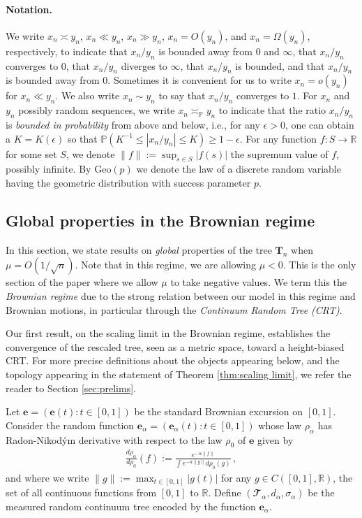 \documentclass{article}
\newcommand{\ccT}{\mathbfcal{T}}
\newcommand{\pr}{\mathbb{P}}								%
\newcommand{\Prob}[1]{\pr\left(#1\right)}					%
\newcommand{\1}{\mathbbm{1}}								%
\theoremstyle{definition}
\numberwithin{equation}{section}
\newcommand{\R}{\mathbb R}
\newcommand{\eps}{\epsilon}
\begin{document}
\paragraph{Notation.}
{We write $x_n\asymp y_n$, $x_n\ll y_n$, $x_n\gg y_n$, $x_n=O(y_n)$, and $x_n=\Omega( y_n)$, respectively, to indicate that $x_n/y_n$ is bounded away from $0$ and $\infty$, that $x_n/y_n$ converges to $0$, that $x_n/y_n$ diverges to $\infty$, that $x_n/y_n$ is bounded, and that $x_n/y_n$ is bounded away from $0$. Sometimes it is convenient for us to write $x_n=o(y_n)$ for $x_n\ll y_n$. We also write $x_n\sim y_n$ to say that $x_n/y_n$ converges to $1$. For $x_n$ and $y_n$ possibly random sequences, we write $x_n\asymp_{\mathbb{P}}y_n$ to indicate that the ratio $x_n/y_n$ is \textit{bounded in probability} from above and below, i.e., for any $\eps>0$, one can obtain a $K=K(\eps)$ so that $\Prob{K^{-1}\leq|x_n/y_n|\leq K}\geq 1-\eps$. For any function $f:S\to \R$ for some set $S$, we denote $\|f\|:=\sup_{s\in S}|f(s)|$ the supremum value of $f$, possibly infinite. By $\mathrm{Geo}(p)$ we denote the law of a discrete random variable having the geometric distribution with success parameter $p$.}

\subsection{Global properties in the Brownian regime}
In this section, we state results on \emph{global} properties of the tree $\mathbf{T}_n$ when $\mu=O( 1/\sqrt{n})$.
Note that in this regime, we are allowing $\mu<0$. This is the only section of the paper where we allow {$\mu$ to take negative values}.
We term this the \emph{Brownian regime} due to the strong relation between our model in this regime and Brownian motions, in particular through the \emph{Continuum Random Tree (CRT)}.

Our first result, on the scaling limit in the Brownian regime, establishes the convergence of the rescaled tree, seen as a metric space, toward a height-biased CRT. {For more precise definitions about the objects appearing below, and the topology appearing in the statement of Theorem \ref{thm:scaling limit}, we refer the reader to Section \ref{sec:prelims}.}

{Let $\mathbf{e}=(\mathbf{e}(t):t \in [0,1])$ be the standard Brownian excursion on $[0,1]$. Consider the random function $\mathbf{e}_\alpha=(\mathbf{e}_\alpha(t):t \in [0,1])$ whose law $\rho_\alpha$ has Radon-Nikodým derivative with respect to the law $\rho_0$ of $\mathbf{e}$ given by
\begin{align*}
    \frac{d\rho_\alpha}{d \rho_0}(f):=\frac{e^{-\alpha \|f\|}}{\int e^{-\alpha \| g \| }d\rho_0 (g)}\, ,
\end{align*}
and where we write $\|g\|:=\max_{t \in [0,1]}|g(t)|$ for any $g \in C([0,1],\R)$, the set of all continuous functions from $[0,1]$ to $\R$. Define $(\ccT_\alpha,d_\alpha,\sigma_\alpha)$ be the measured random continuum tree encoded by the function $\mathbf{e}_\alpha$.
}
\end{document}
